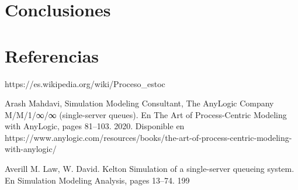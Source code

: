 \section{Conclusiones}
\section{Referencias}
  \label{sec:references}
    https://es.wikipedia.org/wiki/Proceso_estoc%

    Arash Mahdavi, Simulation Modeling Consultant, The AnyLogic Company M/M/1/∞/∞ (single-server
    queues). En The Art of Process-Centric Modeling with AnyLogic, pages 81–103. 2020. Disponible en https://www.anylogic.com/resources/books/the-art-of-process-centric-modeling-with-anylogic/

    Averill M. Law, W. David. Kelton Simulation of a single-server queueing system. En Simulation Modeling Analysis,
    pages 13–74. 199
